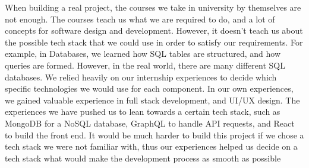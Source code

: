 \documentclass{article}
\begin{document}
When building a real project, the courses we take in university by themselves
are not enough. The courses teach us what we are required to do, and a lot of
concepts for software design and development. However, it doesn't teach us about
the possible tech stack that we could use in order to satisfy our requirements.
For example, in Databases, we learned how SQL tables are structured, and how
queries are formed. However, in the real world, there are many different SQL
databases. We relied heavily on our internship experiences to decide which
specific technologies we would use for each component. In our own experiences,
we gained valuable experience in full stack development, and UI/UX design. The
experiences we have pushed us to lean towards a certain tech stack, such as
MongoDB for a NoSQL database, GraphQL to handle API requests, and React to build
the front end. It would be much harder to build this project if we chose a tech
stack we were not familiar with, thus our experiences helped us decide on a tech
stack what would make the development process as smooth as possible
\end{document}

